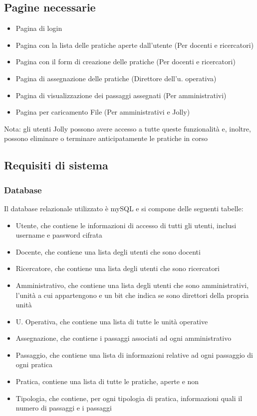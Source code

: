 \documentclass{article}
\begin{document}
\subsection{Pagine necessarie}
\begin{itemize}
    \item Pagina di login 
    \item Pagina con la lista delle pratiche aperte dall'utente (Per docenti e ricercatori)
    \item Pagina con il form di creazione delle pratiche (Per docenti e ricercatori)
    \item Pagina di assegnazione delle pratiche (Direttore dell'u. operativa)
    \item Pagina di visualizzazione dei passaggi assegnati (Per amministrativi)
    \item Pagina per caricamento File (Per amministrativi e Jolly)
\end{itemize}
Nota: gli utenti Jolly possono avere  accesso a tutte queste funzionalità e, inoltre, possono eliminare o terminare anticipatamente le pratiche in corso

\subsection{Requisiti di sistema}
\subsubsection{Database}
Il database relazionale utilizzato è mySQL e si compone delle seguenti tabelle:
\begin{itemize}
    \item Utente, che contiene le informazioni di accesso di tutti gli utenti, inclusi username e password cifrata
    \item Docente, che contiene una lista degli utenti che sono docenti
    \item Ricercatore, che contiene una lista degli utenti che sono ricercatori
    \item Amministrativo, che contiene una lista degli utenti che sono amministrativi, l'unità a cui appartengono e un bit che indica se sono direttori della propria unità
    \item U. Operativa, che contiene una lista di tutte le unità operative
    \item Assegnazione, che contiene i passaggi associati ad ogni amministrativo
    \item Passaggio, che contiene una lista di informazioni relative ad ogni passaggio di ogni pratica
    \item Pratica, contiene una lista di tutte le pratiche, aperte e non
    \item Tipologia, che contiene, per ogni tipologia di pratica, informazioni quali il numero di passaggi e i passaggi
\end{itemize}
\end{document}
